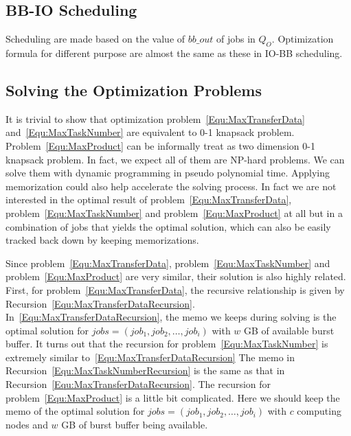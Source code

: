 \subsection{BB-IO Scheduling}
Scheduling are made based on the value of $bb\_out$ of jobs in $Q_O$.
Optimization formula for different purpose are almost the same as these in IO-BB scheduling.


\subsection{Solving the Optimization Problems}
It is trivial to show that optimization problem~\ref{Equ:MaxTransferData}
and~\ref{Equ:MaxTaskNumber}
are equivalent to 0-1 knapsack problem.
Problem~\ref{Equ:MaxProduct} can be informally treat as two dimension 0-1 knapsack problem.
In fact, we expect all of them are NP-hard problems.
We can solve them with dynamic programming in pseudo polynomial time.
Applying memorization could also help accelerate the solving process.
In fact we are not interested in the optimal result of problem~\ref{Equ:MaxTransferData},
problem~\ref{Equ:MaxTaskNumber} and problem~\ref{Equ:MaxProduct} at all
but in a combination of jobs that yields the optimal solution,
which can also be easily tracked back down by keeping memorizations.

Since problem~\ref{Equ:MaxTransferData},
problem~\ref{Equ:MaxTaskNumber} and problem~\ref{Equ:MaxProduct} are very similar, 
their solution is also highly related.
First, for problem~\ref{Equ:MaxTransferData}, the recursive relationship is
given by Recursion~\ref{Equ:MaxTransferDataRecursion}.
In~\ref{Equ:MaxTransferDataRecursion}, the memo we keeps during solving is
the optimal solution for 
$jobs=(job_1, job_2, \ldots, job_i)$ with $w$ GB of available burst buffer.
It turns out that the recursion for problem~\ref{Equ:MaxTaskNumber} is
extremely similar to~\ref{Equ:MaxTransferDataRecursion}
The memo in Recursion~\ref{Equ:MaxTaskNumberRecursion} is the same
as that in Recursion~\ref{Equ:MaxTransferDataRecursion}.
The recursion for problem~\ref{Equ:MaxProduct} is a little bit complicated.
Here we should keep the memo of the optimal solution for $jobs=(job_1, job_2, \ldots, job_i)$
with $c$ computing nodes and $w$ GB of burst buffer being available.

